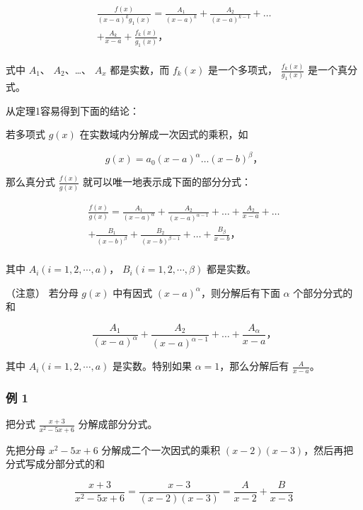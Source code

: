 \[
\begin{array}{l} \frac {f (x)}{(x - a) ^ {k} g _ {1} (x)} = \frac {A _ {1}}{(x - a) ^ {k}} + \frac {A _ {2}}{(x - a) ^ {k - 1}} + \dots \\ + \frac {A _ {k}}{x - a} + \frac {f _ {k} (x)}{g _ {1} (x)}\text{，} \tag {5} \\ \end{array}
\]

式中 \(A_{1}\)、 \(A_{2}\)、\ldots、 \(A_{x}\) 都是实数，而 \(f_{k}(x)\)
是一个多项式， \(\frac{f_{k}(x)}{g_{1}(x)}\) 是一个真分式。

从定理1容易得到下面的结论：

若多项式 \(g(x)\) 在实数域内分解成一次因式的乘积，如

\[
g (x) = a _ {0} (x - a) ^ {\alpha} \dots (x - b) ^ {\beta}\text{，}
\]

那么真分式 \(\frac{f(x)}{g(x)}\) 就可以唯一地表示成下面的部分分式：

\[
\begin{array}{l} \frac {f (x)}{g (x)} = \frac {A _ {1}}{(x - a) ^ {\alpha}} + \frac {A _ {2}}{(x - a) ^ {\alpha - 1}} + \dots + \frac {A _ {2}}{x - a} + \dots \\ + \frac {B _ {1}}{(x - b) ^ {\beta}} + \frac {B _ {2}}{(x - b) ^ {\beta - 1}} + \dots + \frac {B _ {\beta}}{x - b}\text{，} \\ \end{array}
\]

其中 \(A_{i}(i=1,2,\cdots,a)\)， \(B_{i}(i=1,2,\cdots,\beta)\)
都是实数。

（注意） 若分母 \(g(x)\) 中有因式 \((x-a)^{\alpha}\)，则分解后有下面
\(\alpha\) 个部分分式的和

\[
\frac {A _ {1}}{(x - a) ^ {\alpha}} + \frac {A _ {2}}{(x - a) ^ {\alpha - 1}} + \dots + \frac {A _ {\alpha}}{x - a}\text{，}
\]

其中 \(A_{i}(i=1,2,\cdots,a)\) 是实数。特别如果
\(\alpha=1\)，那么分解后有 \(\frac{A}{x-a}\)。

\subsubsection{例 1}

把分式 \(\frac{x + 3}{x^2 - 5x + 6}\) 分解成部分分式。

 先把分母 \(x^{2} - 5x + 6\) 分解成二个一次因式的乘积
\((x - 2)(x - 3)\)，然后再把分式写成分部分式的和

\[
\frac {x + 3}{x ^ {2} - 5 x + 6} = \frac {x - 3}{(x - 2) (x - 3)} = \frac {A}{x - 2} + \frac {B}{x - 3}
\]

